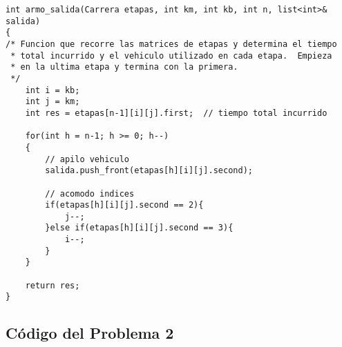 \documentclass[a4paper]{article}
\begin{document}
\vspace*{0.5cm}

\begin{lstlisting}
int armo_salida(Carrera etapas, int km, int kb, int n, list<int>& salida)
{
/* Funcion que recorre las matrices de etapas y determina el tiempo
 * total incurrido y el vehiculo utilizado en cada etapa.  Empieza
 * en la ultima etapa y termina con la primera.
 */
	int i = kb;
	int j = km;
	int res = etapas[n-1][i][j].first;	// tiempo total incurrido
	
	for(int h = n-1; h >= 0; h--)
	{
		// apilo vehiculo
		salida.push_front(etapas[h][i][j].second);
		
		// acomodo indices
		if(etapas[h][i][j].second == 2){
			j--;
		}else if(etapas[h][i][j].second == 3){
			i--;
		}
	}
	
	return res;
}

\end{lstlisting}


\subsection{Código del Problema 2}
\end{document}

